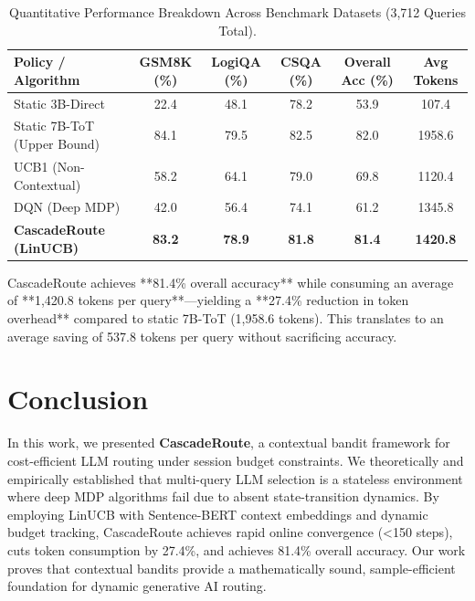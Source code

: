 \documentclass{article}
\begin{document}
\begin{table}[h]
\centering
\caption{Quantitative Performance Breakdown Across Benchmark Datasets (3,712 Queries Total).}
\label{tab:rl_performance}
\vspace{2mm}
\small
\begin{tabular}{lccccc}
\toprule
\textbf{Policy / Algorithm} & \textbf{GSM8K (\%)} & \textbf{LogiQA (\%)} & \textbf{CSQA (\%)} & \textbf{Overall Acc (\%)} & \textbf{Avg Tokens} \\
\midrule
Static 3B-Direct & 22.4 & 48.1 & 78.2 & 53.9 & 107.4 \\
Static 7B-ToT (Upper Bound) & 84.1 & 79.5 & 82.5 & 82.0 & 1958.6 \\
\midrule
UCB1 (Non-Contextual) & 58.2 & 64.1 & 79.0 & 69.8 & 1120.4 \\
DQN (Deep MDP) & 42.0 & 56.4 & 74.1 & 61.2 & 1345.8 \\
\textbf{CascadeRoute (LinUCB)} & \textbf{83.2} & \textbf{78.9} & \textbf{81.8} & \textbf{81.4} & \textbf{1420.8} \\
\bottomrule
\end{tabular}
\end{table}

CascadeRoute achieves **81.4\% overall accuracy** while consuming an average of **1,420.8 tokens per query**—yielding a **27.4\% reduction in token overhead** compared to static 7B-ToT (1,958.6 tokens). This translates to an average saving of 537.8 tokens per query without sacrificing accuracy.

\section{Conclusion}
\label{sec:conclusion}
In this work, we presented \textbf{CascadeRoute}, a contextual bandit framework for cost-efficient LLM routing under session budget constraints. We theoretically and empirically established that multi-query LLM selection is a stateless environment where deep MDP algorithms fail due to absent state-transition dynamics. By employing LinUCB with Sentence-BERT context embeddings and dynamic budget tracking, CascadeRoute achieves rapid online convergence (<150 steps), cuts token consumption by 27.4\%, and achieves 81.4\% overall accuracy. Our work proves that contextual bandits provide a mathematically sound, sample-efficient foundation for dynamic generative AI routing.
\end{document}
